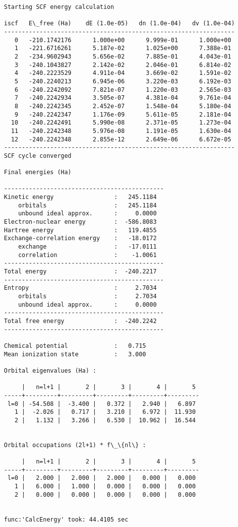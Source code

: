 \documentclass[11pt]{article}
\begin{document}
    \begin{Verbatim}[commandchars=\\\{\}]
Starting SCF energy calculation

iscf   E\_free (Ha)    dE (1.0e-05)   dn (1.0e-04)   dv (1.0e-04)
-----------------------------------------------------------------
   0   -210.1742176      1.000e+00      9.999e-01      1.000e+00
   1   -221.6716261      5.187e-02      1.025e+00      7.388e-01
   2   -234.9602943      5.656e-02      7.885e-01      4.043e-01
   3   -240.1043827      2.142e-02      2.046e-01      6.814e-02
   4   -240.2223529      4.911e-04      3.669e-02      1.591e-02
   5   -240.2240213      6.945e-06      3.220e-03      6.192e-03
   6   -240.2242092      7.821e-07      1.220e-03      2.565e-03
   7   -240.2242934      3.505e-07      4.381e-04      9.761e-04
   8   -240.2242345      2.452e-07      1.548e-04      5.180e-04
   9   -240.2242347      1.176e-09      5.611e-05      2.181e-04
  10   -240.2242491      5.990e-08      2.371e-05      1.273e-04
  11   -240.2242348      5.976e-08      1.191e-05      1.630e-04
  12   -240.2242348      2.855e-12      2.649e-06      6.672e-05
-----------------------------------------------------------------
SCF cycle converged

Final energies (Ha)

---------------------------------------------
Kinetic energy                 :   245.1184
    orbitals                   :   245.1184
    unbound ideal approx.      :     0.0000
Electron-nuclear energy        :  -586.8083
Hartree energy                 :   119.4855
Exchange-correlation energy    :   -18.0172
    exchange                   :   -17.0111
    correlation                :    -1.0061
---------------------------------------------
Total energy                   :  -240.2217
---------------------------------------------
Entropy                        :     2.7034
    orbitals                   :     2.7034
    unbound ideal approx.      :     0.0000
---------------------------------------------
Total free energy              :  -240.2242
---------------------------------------------

Chemical potential             :   0.715
Mean ionization state          :   3.000

Orbital eigenvalues (Ha) :

     |   n=l+1 |       2 |       3 |       4 |       5
-----+---------+---------+---------+---------+---------
 l=0 | -54.508 |  -3.400 |   0.372 |   2.940 |   6.897
   1 |  -2.026 |   0.717 |   3.210 |   6.972 |  11.930
   2 |   1.132 |   3.266 |   6.530 |  10.962 |  16.544


Orbital occupations (2l+1) * f\_\{nl\} :

     |   n=l+1 |       2 |       3 |       4 |       5
-----+---------+---------+---------+---------+---------
 l=0 |   2.000 |   2.000 |   2.000 |   0.000 |   0.000
   1 |   6.000 |   1.000 |   0.000 |   0.000 |   0.000
   2 |   0.000 |   0.000 |   0.000 |   0.000 |   0.000


func:'CalcEnergy' took: 44.4105 sec
    \end{Verbatim}
\end{document}
